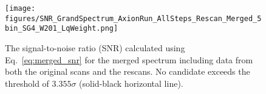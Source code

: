 
\begin{figure}[hbt!]
    \centering
    \texttt{[image: figures/SNR\_GrandSpectrum\_AxionRun\_AllSteps\_Rescan\_Merged\_5bin\_SG4\_W201\_LqWeight.png]}
    \caption{The signal-to-noise ratio (SNR) calculated using Eq.~\eqref{eq:merged_snr} for the merged spectrum including data from both the original 
scans and the rescans. No candidate exceeds the threshold of 
$3.355\sigma$ (solid-black horizontal line). }
    \label{fig:SNR_merged}
\end{figure}
